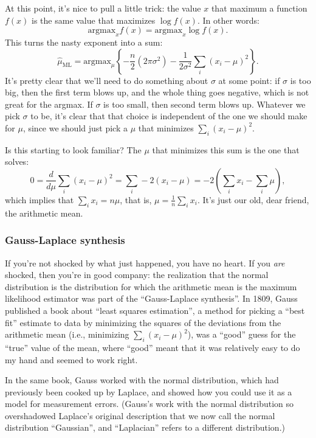 \documentclass{book}
\begin{document}
At this point, it's nice to pull a little trick: the value \(x\) that
maximum a function \(f(x)\) is the same value that maximizes
\(\log f(x)\). In other words: \[
\mathrm{argmax}_x f(x) = \mathrm{argmax}_x \log f(x).
\] This turns the nasty exponent into a sum: \[
\hat{\mu}_\mathrm{ML} = \mathrm{argmax}_\mu \left\{ -\frac{n}{2} \left(2 \pi \sigma^2\right) - \frac{1}{2\sigma^2} \sum_i (x_i-\mu)^2 \right\}.
\] It's pretty clear that we'll need to do something about \(\sigma\) at
some point: if \(\sigma\) is too big, then the first term blows up, and
the whole thing goes negative, which is not great for the argmax. If
\(\sigma\) is too small, then second term blows up. Whatever we pick
\(\sigma\) to be, it's clear that that choice is independent of the one
we should make for \(\mu\), since we should just pick a \(\mu\) that
minimizes \(\sum_i (x_i - \mu)^2\).

Is this starting to look familiar? The \(\mu\) that minimizes this sum
is the one that solves: \[
0 = \frac{d}{d\mu} \sum_i (x_i - \mu)^2 = \sum_i -2 (x_i - \mu) = -2 \left( \sum_i x_i - \sum_i \mu \right),
\] which implies that \(\sum_i x_i = n\mu\), that is,
\(\mu = \tfrac{1}{n} \sum_i x_i\). It's just our old, dear friend, the
arithmetic mean.

\subsubsection{Gauss-Laplace synthesis}\label{gauss-laplace-synthesis}

If you're not shocked by what just happened, you have no heart. If you
\emph{are} shocked, then you're in good company: the realization that
the normal distribution is the distribution for which the arithmetic
mean is the maximum likelihood estimator was part of the ``Gauss-Laplace
synthesis''. In 1809, Gauss published a book about ``least squares
estimation'', a method for picking a ``best fit'' estimate to data by
minimizing the squares of the deviations from the arithmetic mean (i.e.,
minimizing \(\sum_i (x_i - \mu)^2\)), was a ``good'' guess for the
``true'' value of the mean, where ``good'' meant that it was relatively
easy to do my hand and seemed to work right.

In the same book, Gauss worked with the normal distribution, which had
previously been cooked up by Laplace, and showed how you could use it as
a model for measurement errors. (Gauss's work with the normal
distribution so overshadowed Laplace's original description that we now
call the normal distribution ``Gaussian'', and ``Laplacian'' refers to a
different distribution.)
\end{document}
